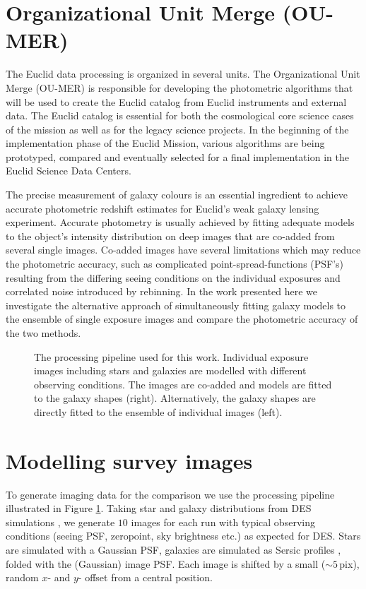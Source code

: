 \section{Organizational Unit Merge (OU-MER)}
The Euclid data processing is organized in several units.
The Organizational Unit Merge (OU-MER) is responsible for developing the photometric
algorithms that will be used to create the Euclid catalog from Euclid instruments and
external data. The Euclid catalog is essential for both the
cosmological core science cases of the mission as well as for the
legacy science projects. In the beginning of the implementation phase of
the Euclid Mission, various algorithms are being
prototyped, compared and eventually selected for a final implementation in
the Euclid Science Data Centers.

The precise measurement of galaxy colours is an essential ingredient to achieve
accurate photometric redshift estimates for Euclid's weak galaxy lensing experiment.
Accurate photometry is usually achieved by fitting adequate models to the object's
intensity distribution on deep images that are co-added from several single images.
Co-added images have several limitations which may reduce the photometric
accuracy, such as complicated point-spread-functions (PSF's) resulting from the
differing seeing conditions on the individual exposures and correlated noise
introduced by rebinning. In the work presented here we investigate
the alternative approach of simultaneously fitting galaxy models to the ensemble of single exposure
images and compare the photometric accuracy of the two methods.

%
\begin{figure}[t]
\caption{The processing pipeline used for this work. Individual exposure images including
stars and galaxies are modelled with different observing conditions. The images are co-added
and models are fitted to the galaxy shapes (right). Alternatively, the galaxy shapes
are directly fitted to the ensemble of individual images (left).}
\label{Kufig1}
\end{figure}
%
\section{Modelling survey images}
To generate imaging data for the comparison we use the processing pipeline illustrated
in Figure \ref{Kufig1}. Taking star and galaxy distributions from DES simulations
\citep{2010AAS...21547007L}, we generate $10$ images for each run
with typical observing conditions (seeing PSF, zeropoint, sky brightness etc.)
as expected for DES. Stars are simulated with a Gaussian PSF, galaxies
are simulated as Sersic profiles \citep{1968adga.book.S}, folded with the (Gaussian)
image PSF. Each image is shifted by a small ($\sim5$\,pix), random $x$- and $y$- offset from a
central position.

